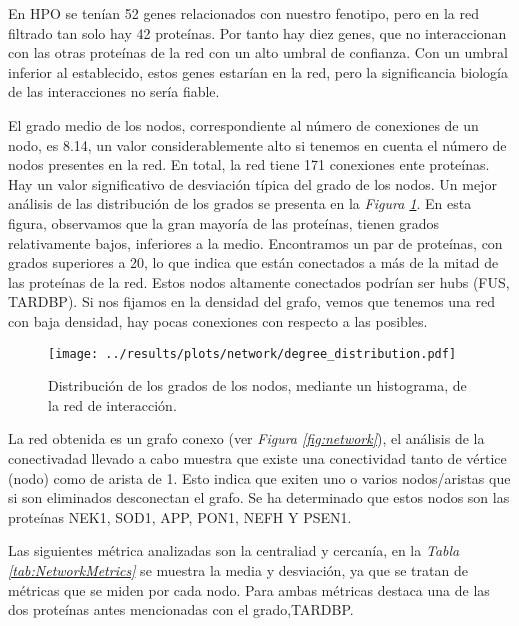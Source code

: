 En HPO se tenían 52 genes relacionados con nuestro fenotipo, pero en la red filtrado tan solo hay 42 proteínas. 
Por tanto hay diez genes, que no interaccionan con las otras proteínas de la red con un alto umbral de confianza. 
Con un umbral inferior al establecido,  estos genes estarían en la red, pero la significancia biología de las interacciones no sería fiable.

El grado medio de los nodos, correspondiente al número de conexiones de un nodo, es 8.14, un valor considerablemente alto si tenemos en cuenta el número de nodos presentes en la red. En total, la red tiene 171 conexiones ente proteínas.
Hay un valor significativo de desviación típica del grado de los nodos. Un mejor análisis de las distribución de los grados se presenta en la \textit{Figura \ref{fig:degree}}. 
En esta figura, observamos que la gran mayoría de las proteínas, tienen grados relativamente bajos, inferiores a la medio. Encontramos un par de proteínas, con grados superiores a 20, lo que indica que están conectados a más de la mitad de las proteínas de la red.
Estos nodos altamente conectados podrían ser hubs (FUS, TARDBP). %
Si nos fijamos en la densidad del grafo, vemos que tenemos una red con baja densidad, hay pocas conexiones con respecto a las posibles.


\begin{figure}[h]
	\centering
	\texttt{[image: ../results/plots/network/degree\_distribution.pdf]}
	\caption{Distribución de los grados de los nodos, mediante un histograma, de la red de interacción.}
	\label{fig:degree}
\end{figure}

La red obtenida es un grafo conexo (ver \textit{Figura \ref{fig:network}}), el análisis de la conectivadad llevado a cabo muestra que existe una conectividad tanto de vértice (nodo) como de arista de 1.
Esto indica que exiten uno o varios nodos/aristas que si son eliminados desconectan el grafo. Se ha determinado que estos nodos son las proteínas NEK1, SOD1, APP, PON1, NEFH Y PSEN1.

Las siguientes métrica analizadas son la centraliad y cercanía, en la \textit{Tabla \ref{tab:NetworkMetrics}} se muestra la media y desviación, 
ya que se tratan de métricas que se miden por cada nodo. Para ambas métricas destaca una de las dos proteínas antes mencionadas con el grado,TARDBP.

